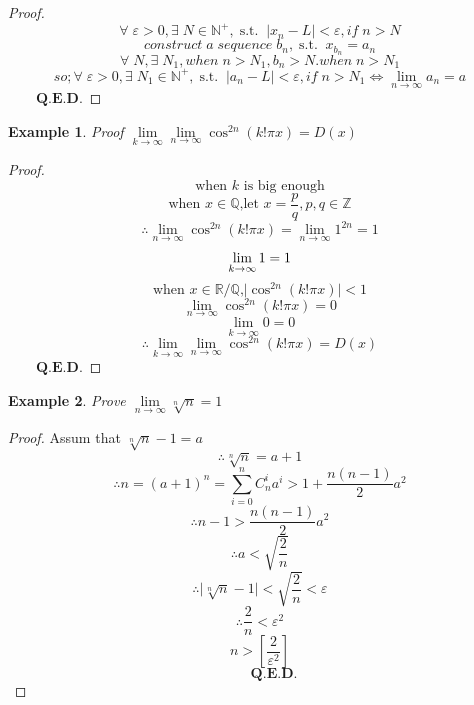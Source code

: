 \documentclass[a4paper,12pt]{report}
\newtheorem{example}{Example}[section]       %
\newtheorem*{proof}{Proof}    %
\newcommand{\st}{\operatorname{s.t.}}
\begin{document}
\begin{proof}
    $$\forall\;\varepsilon>0,\exists\; N\in\mathbb{N}^+,\st\;\vert x_n-L\vert<\varepsilon,if\;n>N$$
    $$construct\;a\;sequence\;{b_n},\st\;x_{b_n}=a_n$$
    $$\forall\; N,\exists\; N_1,when\;n>N_1,b_n>N.when\;n>N_1$$
    $$so;\forall\;\varepsilon>0,\exists\; N_1\in\mathbb{N}^+,\st\;\vert a_n-L\vert<\varepsilon,if\;n>N_1\Leftrightarrow\lim\limits_{n\rightarrow\infty}{a_n}=a$$
$\qquad\mathbf{Q.E.D.}$
\end{proof}
\begin{example}
    Proof $\lim\limits_{k\rightarrow\infty}{\lim\limits_{n\rightarrow\infty}{\cos^{2n}(k!\pi x)}}=D(x)$ 
\end{example}
\begin{proof}
    $$\text{when $k$ is big enough}$$
    $$\text{when $x\in\mathbb{Q}$,let $x=\displaystyle\frac{p}{q},p,q\in\mathbb{Z}$}$$
    $$\therefore \lim\limits_{n\rightarrow\infty}{\cos^{2n}(k!\pi x)}=\lim\limits_{n\rightarrow\infty}{1^{2n}}=1$$
    $$\lim\limits_{k\rightarrow\infty}{1}=1\\$$
    $$\text{when $x\in\mathbb{R}/\mathbb{Q}$,}\vert\cos^{2n}(k!\pi x)\vert<1$$
    $$\lim\limits_{n\rightarrow\infty}{\cos^{2n}(k!\pi x)}=0$$
    $$\lim\limits_{k\rightarrow\infty}{0}=0$$
$$\therefore\lim\limits_{k\rightarrow\infty}{\lim\limits_{n\rightarrow\infty}{\cos^{2n}(k!\pi x)}}=D(x)$$
$\qquad\mathbf{Q.E.D.}$
\end{proof}
\begin{example}
    Prove $\lim\limits_{n\rightarrow\infty}{\sqrt[n]{n}}=1$
\end{example}
\begin{proof}
    Assum that $\sqrt[n]{n}-1=a$
    $$\therefore \sqrt[n]{n}=a+1$$
    $$\therefore n=(a+1)^n=\sum\limits_{i=0}^{n}C_n^ia^i>1+\displaystyle\frac{n(n-1)}{2}a^2$$
    $$\therefore n-1>\displaystyle\frac{n(n-1)}{2}a^2$$
    $$\therefore a<\sqrt{\displaystyle\frac{2}{n}}$$
    $$\therefore \vert\sqrt[n]{n}-1\vert<\sqrt{\displaystyle\frac{2}{n}}<\varepsilon$$
    $$\therefore \displaystyle\frac{2}{n}<\varepsilon^2$$
    $$n>\left[\displaystyle\frac{2}{\varepsilon^2}\right]$$
    $$\qquad\mathbf{Q.E.D.}$$
\end{proof}
\end{document}
